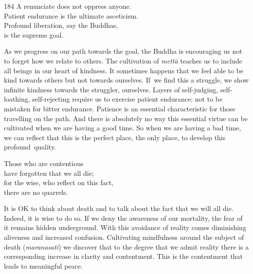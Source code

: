 
\begin{dhpVerse}{184}
\label{dhp-184}
A renunciate does not oppress anyone.\\
Patient endurance is the ultimate asceticism.\\
Profound liberation, say the Buddhas,\\
is the supreme goal.
\end{dhpVerse}

\begin{dhpRefl}

As we progress on our path towards the goal, the Buddha is
encouraging us not to forget how we relate to others. The
cultivation of \emph{mettā} teaches us to include all beings in our heart of
kindness. It sometimes happens that we feel able to be kind towards
others but not towards ourselves. If~we find this a struggle, we show
infinite kindness towards the struggler, ourselves. Layers of
self-judging, self-loathing, self-rejecting require us to exercise
patient endurance; not to be mistaken for bitter endurance. Patience
is an essential characteristic for those travelling on the path. And
there is absolutely no way this essential virtue can be cultivated
when we are having a good time. So when we are having a bad time,
we can reflect that this is the perfect place, the only place, to develop
this profound~quality.

\end{dhpRefl}


\begin{dhpVerse}{6}
\label{dhp-6}
Those who are contentious\\
have forgotten that we all die;\\
for the wise, who reflect on this fact,\\
there are no quarrels.
\end{dhpVerse}

\begin{dhpRefl}

It is OK to think about death and to talk about the fact that we will all
die. Indeed, it is wise to do so. If we deny the awareness of our
mortality, the fear of it remains hidden underground. With this
avoidance of reality comes diminishing aliveness and increased
confusion. Cultivating mindfulness around the subject of death
(\emph{maranasati}) we discover that to the degree that we admit reality there is
a corresponding increase in clarity and contentment. This is the
contentment that leads to meaningful peace.

\end{dhpRefl}

